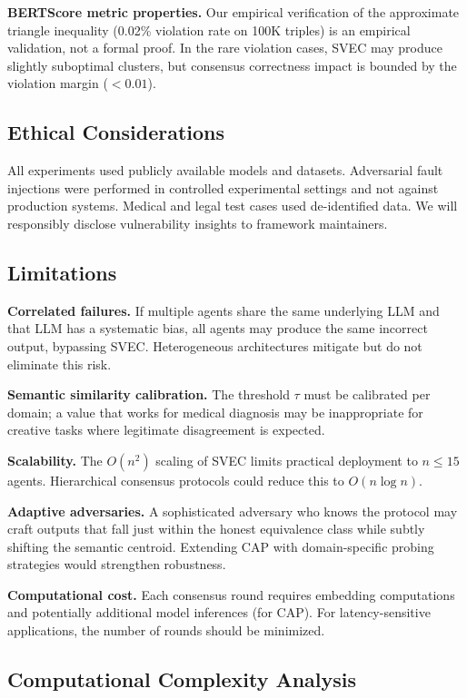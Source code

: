 \documentclass[journal,10pt]{IEEEtran}
\begin{document}
\textbf{BERTScore metric properties.} Our empirical verification of the approximate triangle inequality (0.02\% violation rate on 100K triples) is an empirical validation, not a formal proof. In the rare violation cases, SVEC may produce slightly suboptimal clusters, but consensus correctness impact is bounded by the violation margin ($< 0.01$).

\subsection{Ethical Considerations}
All experiments used publicly available models and datasets. Adversarial fault injections were performed in controlled experimental settings and not against production systems. Medical and legal test cases used de-identified data. We will responsibly disclose vulnerability insights to framework maintainers.

\subsection{Limitations}
\textbf{Correlated failures.} If multiple agents share the same underlying LLM and that LLM has a systematic bias, all agents may produce the same incorrect output, bypassing SVEC. Heterogeneous architectures mitigate but do not eliminate this risk.

\textbf{Semantic similarity calibration.} The threshold $\tau$ must be calibrated per domain; a value that works for medical diagnosis may be inappropriate for creative tasks where legitimate disagreement is expected.

\textbf{Scalability.} The $O(n^2)$ scaling of SVEC limits practical deployment to $n \leq 15$ agents. Hierarchical consensus protocols could reduce this to $O(n \log n)$.

\textbf{Adaptive adversaries.} A sophisticated adversary who knows the protocol may craft outputs that fall just within the honest equivalence class while subtly shifting the semantic centroid. Extending CAP with domain-specific probing strategies would strengthen robustness.

\textbf{Computational cost.} Each consensus round requires embedding computations and potentially additional model inferences (for CAP). For latency-sensitive applications, the number of rounds should be minimized.


\subsection{Computational Complexity Analysis}
\end{document}
